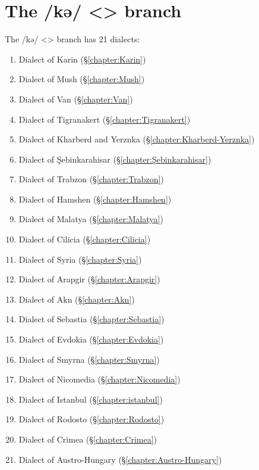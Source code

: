 \part{The /kə/ <> branch}
\begin{adjarianpage}\label{page:103}\end{adjarianpage}%

The /kə/ <> branch has 21 dialects:

\begin{enumerate}
	\item Dialect of Karin (\S\ref{chapter:Karin})
	\item Dialect of Mush (\S\ref{chapter:Mush})
	\item Dialect of Van (\S\ref{chapter:Van})
	\item Dialect of Tigranakert (\S\ref{chapter:Tigranakert})
	\item Dialect of Kharberd and Yerznka (\S\ref{chapter:Kharberd-Yerznka})
	\item Dialect of Şebinkarahisar (\S\ref{chapter:Şebinkarahisar})
	\item Dialect of Trabzon (\S\ref{chapter:Trabzon}) 
	\item Dialect of Hamshen (\S\ref{chapter:Hamshen})
	\item Dialect of Malatya (\S\ref{chapter:Malatya})
	\item Dialect of Cilicia (\S\ref{chapter:Cilicia})
	\item Dialect of Syria (\S\ref{chapter:Syria})
	\item Dialect of Arapgir (\S\ref{chapter:Arapgir})
	\item Dialect of Akn (\S\ref{chapter:Akn})
	\item Dialect of Sebastia (\S\ref{chapter:Sebastia})
	\item Dialect of Evdokia (\S\ref{chapter:Evdokia})
	\item Dialect of Smyrna (\S\ref{chapter:Smyrna})
	\item Dialect of Nicomedia (\S\ref{chapter:Nicomedia})
	\item Dialect of Istanbul (\S\ref{chapter:istanbul})
	\item Dialect of Rodosto (\S\ref{chapter:Rodosto})
	\item Dialect of Crimea (\S\ref{chapter:Crimea})
	\item Dialect of Austro-Hungary (\S\ref{chapter:Austro-Hungary})
	
	
\end{enumerate}

